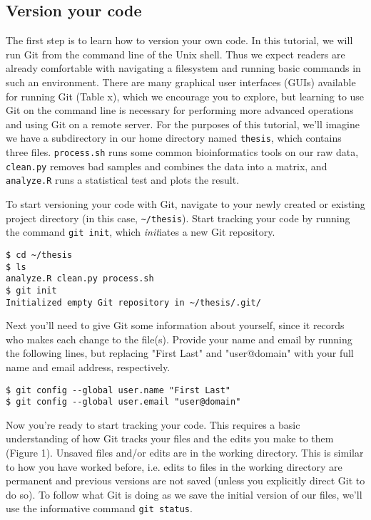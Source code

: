 \subsection{Version your code}

The first step is to learn how to version your own code. In this tutorial, we will run Git from the command line of the Unix shell. Thus we expect readers are already comfortable with navigating a filesystem and running basic commands in such an environment. There are many graphical user interfaces (GUIs) available for running Git (Table x), which we encourage you to explore, but learning to use Git on the command line is necessary for performing more advanced operations and using Git on a remote server. For the purposes of this tutorial, we'll imagine we have a subdirectory in our home directory named \verb|thesis|, which contains three files. \verb|process.sh| runs some common bioinformatics tools on our raw data, \verb|clean.py| removes bad samples and combines the data into a matrix, and \verb|analyze.R| runs a statistical test and plots the result.

To start versioning your code with Git, navigate to your newly created or existing project directory (in this case, \verb|~/thesis|).  Start tracking your code by running the command \verb|git init|, which \textit{init}iates a new Git repository.

\begin{lstlisting}
$ cd ~/thesis
$ ls
analyze.R clean.py process.sh
$ git init
Initialized empty Git repository in ~/thesis/.git/
\end{lstlisting}

Next you'll need to give Git some information about yourself, since it records who makes each change to the file(s). Provide your name and email by running the following lines, but replacing "First Last" and "user@domain" with your full name and email address, respectively.

\begin{lstlisting}
$ git config --global user.name "First Last"
$ git config --global user.email "user@domain"
\end{lstlisting}

Now you're ready to start tracking your code.
This requires a basic understanding of how Git tracks your files and the edits you make to them (Figure 1).
Unsaved files and/or edits are in the working directory.
This is similar to how you have worked before, i.e. edits to files in the working directory are  permanent and previous versions are not saved (unless you explicitly direct Git to do so).
To follow what Git is doing as we save the initial version of our files, we'll use the informative command \verb|git status|.

